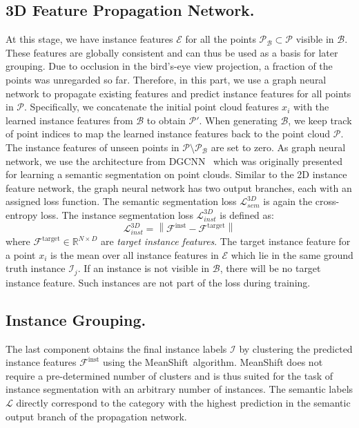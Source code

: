 \documentclass[runningheads]{llncs}
\newcommand\norm[1]{\left\lVert#1\right\rVert}
\begin{document}
{\subsection{3D Feature Propagation Network.}
At this stage, we have instance features $\mathcal{E}$ for all the points $\mathcal{P}_{\mathcal{B}} \subset \mathcal{P}$ visible in $\mathcal{B}$.
These features are globally consistent and can thus be used as a basis for later grouping. Due to occlusion in the bird's-eye view projection, a fraction of the points was unregarded so far.
Therefore, in this part, we use a graph neural network to propagate existing features and predict instance features for all points in $\mathcal{P}$.
Specifically, we concatenate the initial point cloud features $x_i$ with the learned instance features from $\mathcal{B}$ to obtain $\mathcal{P}'$.
When generating $\mathcal{B}$, we keep track of point indices to map the learned instance features back to the point cloud $\mathcal{P}$.
The instance features of unseen points in $\mathcal{P} \setminus \mathcal{P}_{\mathcal{B}}$ are set to zero.
As graph neural network, we use the architecture from DGCNN \,\cite{Wang18CoRR} which was originally presented for learning a semantic segmentation on point clouds. 
Similar to the 2D instance feature network, the graph neural network has two output branches, each with an assigned loss function. The semantic segmentation loss $\mathcal{L}^{3D}_{sem}$ is again the cross-entropy loss. The instance segmentation loss $\mathcal{L}^{3D}_{inst}$ is defined as:
\begin{equation}
\mathcal{L}^{3D}_{inst} = \norm{\mathcal{F}^{\text{inst}} - \mathcal{F}^{\text{target}}}
\end{equation}
where $\mathcal{F}^{\text{target}} \in \mathbb{R}^{N\times D}$ are \emph{target instance features}.
The target instance feature for a point $x_i$ is the mean over all instance features in $\mathcal{E}$ which lie in the same ground truth instance $\mathcal{I}_j$.
If an instance is not visible in $\mathcal{B}$, there will be no target instance feature. Such instances are not part of the loss during training.


\subsection{Instance Grouping.}
The last component obtains the final instance labels $\mathcal{I}$ by clustering the predicted instance features $\mathcal{F}^{\text{inst}}$ using the MeanShift\,\cite{Comaniciu02PAMI} algorithm.
MeanShift does not require a pre-determined number of clusters and is thus suited for the task of instance segmentation with an arbitrary number of instances.
The semantic labels $\mathcal{L}$ directly correspond to the category with the highest prediction in the semantic output branch of the propagation network.

}
\end{document}

